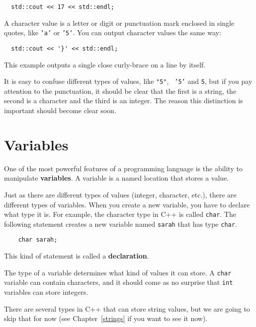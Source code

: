 \begin{verbatim}
  std::cout << 17 << std::endl;
\end{verbatim}

A character value is a letter or digit or punctuation mark
enclosed in single quotes, like {\tt 'a'} or {\tt '5'}.
You can output character values the same way:


\begin{verbatim}
  std::cout << '}' << std::endl;
\end{verbatim}

This example outputs a single close curly-brace on a line
by itself.

It is easy to confuse different types of values, like {\tt "5"}, {\tt
'5'} and {\tt 5}, but if you pay attention to the punctuation, it
should be clear that the first is a string, the second is a character
and the third is an integer.  The reason this distinction is important
should become clear soon.

\section {Variables}

One of the most powerful features of a programming language is the
ability to manipulate {\bf variables}.  A variable is a named location
that stores a value.  

Just as there are different types of values (integer, character,
etc.), there are different types of variables.  When you create a new
variable, you have to declare what type it is.  For example, the
character type in C++ is called {\tt char}.  The following statement
creates a new variable named {\tt sarah} that has type {\tt char}.

\begin{verbatim}
    char sarah;
\end{verbatim}

This kind of statement is called a {\bf declaration}.

The type of a variable determines what kind of values it can
store.  A {\tt char} variable can contain characters, and it should
come as no surprise that {\tt int} variables can store integers.

There are several types in C++ that can store string values, but we
are going to skip that for now (see Chapter~\ref{strings} if you want to see it now).


